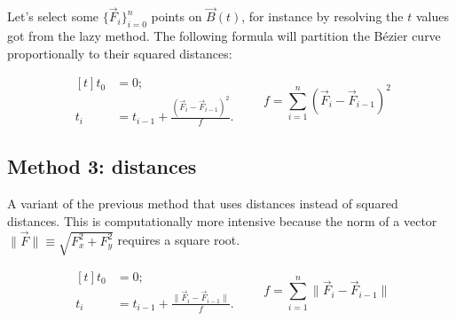 \documentclass{scrartcl}
\newcommand\V[1]{\vec{#1}}
\begin{document}
Let's select some $\{\V{F}_i\}_{i=0}^n$ points on $\V{B}(t)$, for
instance by resolving the $t$ values got from the lazy method. The
following formula will partition the Bézier curve proportionally to
their squared distances:

\begin{equation*}
\begin{aligned}[t]
    t_0 &= 0; \\
    t_i &= t_{i-1} + \frac{\left( \V{F}_i - \V{F}_{i-1} \right)^2}{f}.
\end{aligned}
\qquad f = \sum_{i=1}^n \left( \V{F}_i - \V{F}_{i-1} \right)^2
\end{equation*}

\subsection{Method 3: distances}

A variant of the previous method that uses distances instead of squared
distances. This is computationally more intensive because the norm of
a vector $\| \V{F} \| \equiv \sqrt{F_x^2 + F_y^2}$ requires a square
root.

\begin{equation*}
\begin{aligned}[t]
    t_0 &= 0; \\
    t_i &= t_{i-1} + \frac{\| \V{F}_i - \V{F}_{i-1} \|}{f}.
\end{aligned}
\qquad f = \sum_{i=1}^n \| \V{F}_i - \V{F}_{i-1} \|
\end{equation*}
\end{document}
